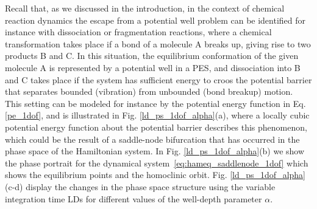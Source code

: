 \documentclass{ws-ijbc}
\begin{document}
Recall that, as we discussed in the introduction, in the context of chemical reaction dynamics the escape from a potential well problem can be identified for instance with dissociation or fragmentation reactions, where
a chemical transformation takes place if a bond of a molecule A breaks up, giving rise to two products B and C. In this situation, the equilibrium conformation of the given molecule A is represented by a potential well in a PES, and dissociation into B and C takes place if the system has sufficient energy to croos the potential barrier that separates bounded (vibration) from unbounded (bond breakup) motion. This setting can be modeled for instance by the potential energy function in Eq. \eqref{pe_1dof}, and is illustrated in Fig. \ref{ld_ps_1dof_alpha}(a), where a locally cubic potential energy function about the potential barrier describes this phenomenon, which could be the result of a saddle-node bifurcation that has occurred in the phase space of the Hamiltonian system. In Fig. \ref{ld_ps_1dof_alpha}(b) we show the phase portrait for the dynamical system~\eqref{eq:hameq_saddlenode_1dof} which shows the equilibrium points and the homoclinic orbit. Fig. \ref{ld_ps_1dof_alpha}(c-d) display the changes in the phase space structure using the variable integration time LDs for different values of the well-depth parameter $\alpha$.
\end{document}
